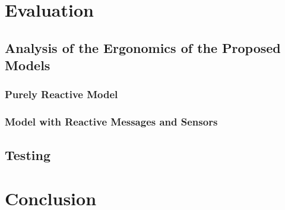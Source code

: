 \documentclass[12pt,a4paper,openright,twoside]{book}
\begin{document}
\chapter{Evaluation}
\label{chap:evaluation}

\section{Analysis of the Ergonomics of the Proposed Models}

\subsection{Purely Reactive Model}

\subsection{Model with Reactive Messages and Sensors}

\section{Testing}

\chapter{Conclusion}
\label{chap:conclusion}



\backmatter

\nocite{*} %



\end{document}
